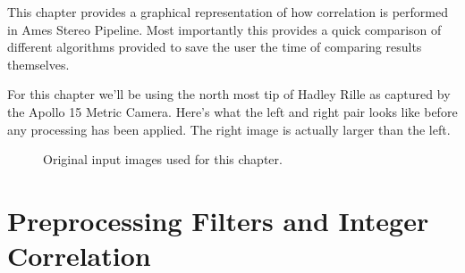 This chapter provides a graphical representation of how correlation is
performed in Ames Stereo Pipeline. Most importantly this provides a
quick comparison of different algorithms provided to save the user the
time of comparing results themselves.

For this chapter we'll be using the north most tip of Hadley Rille as
captured by the Apollo 15 Metric Camera. Here's what the left and right
pair looks like before any processing has been applied. The right image
is actually larger than the left.

\begin{figure}[hb]
\centering
  \hfil
\caption{Original input images used for this chapter.}
\label{fig:input_images}
\end{figure}

\section{Preprocessing Filters and Integer Correlation}
\label{sec:prefilter_n_correlation}

